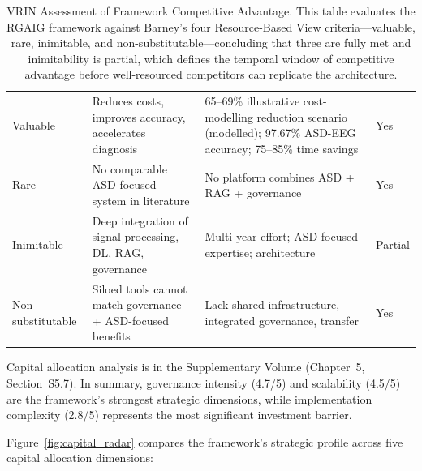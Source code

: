 \begin{table}[H]
\tablestripes\tablefontsize
\tablefontsize
\caption[VRIN Assessment of Framework Competitive Advantage]{VRIN Assessment of Framework Competitive Advantage. This table evaluates the RGAIG framework against Barney's four Resource-Based View criteria---valuable, rare, inimitable, and non-substitutable---concluding that three are fully met and inimitability is partial, which defines the temporal window of competitive advantage before well-resourced competitors can replicate the architecture.}
\begin{tabularx}{\textwidth}{@{} >{\raggedright\arraybackslash}p{2.4cm} L L >{\raggedright\arraybackslash}p{1.0cm} @{}}
\toprule
{} &  &  &  \\
\midrule
Valuable & Reduces costs, improves accuracy, accelerates diagnosis & 65--69\% illustrative cost-modelling reduction scenario (modelled); 97.67\% ASD-EEG accuracy; 75--85\% time savings & Yes \\
\addlinespace
Rare & No comparable ASD-focused system in literature & No platform combines ASD + RAG + governance & Yes \\
\addlinespace
Inimitable & Deep integration of signal processing, DL, RAG, governance & Multi-year effort; ASD-focused expertise; architecture & Partial \\
\addlinespace
Non-substitutable & Siloed tools cannot match governance + ASD-focused benefits & Lack shared infrastructure, integrated governance, transfer & Yes \\
\bottomrule
\end{tabularx}
\end{table}

Capital allocation analysis is in the Supplementary Volume (Chapter~5, Section~S5.7). In summary, governance intensity (4.7/5) and scalability (4.5/5) are the framework's strongest strategic dimensions, while implementation complexity (2.8/5) represents the most significant investment barrier.

\iffalse
Figure~\ref{fig:capital_radar} compares the framework's strategic profile across five capital allocation dimensions:

